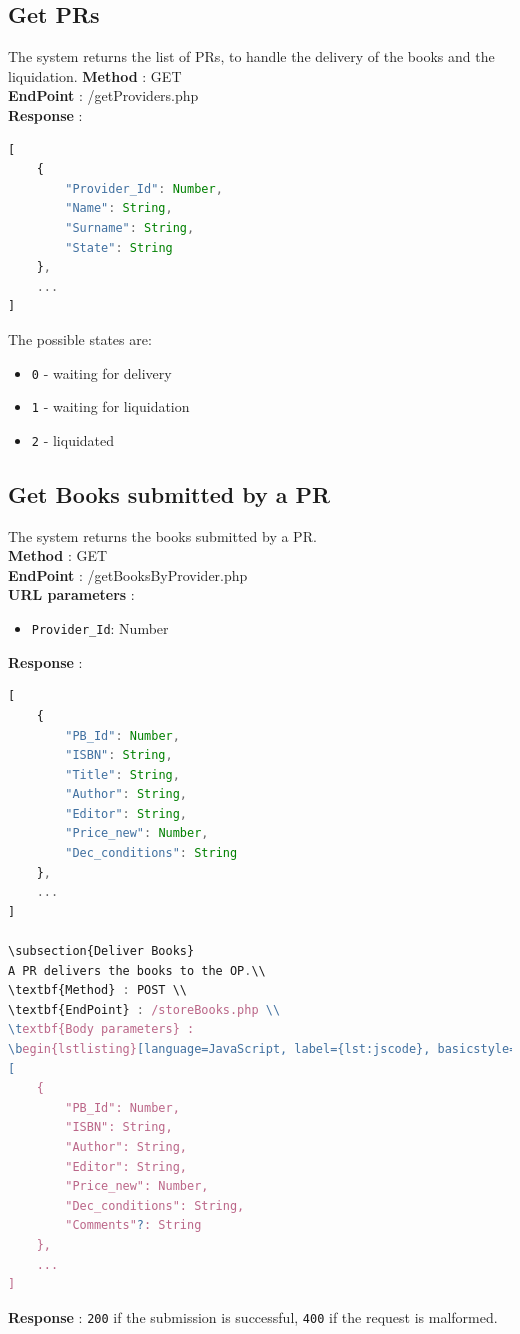 \subsection{Get PRs}
The system returns the list of PRs, to handle the delivery of the books and the liquidation.
\textbf{Method} : GET \\
\textbf{EndPoint} : /getProviders.php \\
\textbf{Response} :
\begin{lstlisting}[language=JavaScript, label={lst:jscode}, basicstyle=\ttfamily]
[
    {
        "Provider_Id": Number,
        "Name": String,
        "Surname": String,
        "State": String
    },
    ...
]
\end{lstlisting}
The possible states are:
\begin{itemize}
    \item \texttt{0} - waiting for delivery
    \item \texttt{1} - waiting for liquidation
    \item \texttt{2} - liquidated
\end{itemize}

\subsection{Get Books submitted by a PR}
The system returns the books submitted by a PR.\\
\textbf{Method} : GET \\
\textbf{EndPoint} : /getBooksByProvider.php \\
\textbf{URL parameters} :
\begin{itemize}
    \item \texttt{Provider\_Id}: Number
\end{itemize}
\textbf{Response} :
\begin{lstlisting}[language=JavaScript, label={lst:jscode}, basicstyle=\ttfamily]
[
    {
        "PB_Id": Number,
        "ISBN": String,
        "Title": String,
        "Author": String,
        "Editor": String,
        "Price_new": Number,
        "Dec_conditions": String
    },
    ...
]

\subsection{Deliver Books}
A PR delivers the books to the OP.\\
\textbf{Method} : POST \\
\textbf{EndPoint} : /storeBooks.php \\
\textbf{Body parameters} :
\begin{lstlisting}[language=JavaScript, label={lst:jscode}, basicstyle=\ttfamily]
[
    {
        "PB_Id": Number,
        "ISBN": String,
        "Author": String,
        "Editor": String,
        "Price_new": Number,
        "Dec_conditions": String,
        "Comments"?: String
    },
    ...
]
\end{lstlisting}
\textbf{Response} : \texttt{200} if the submission is successful, \texttt{400} if the request is malformed.

